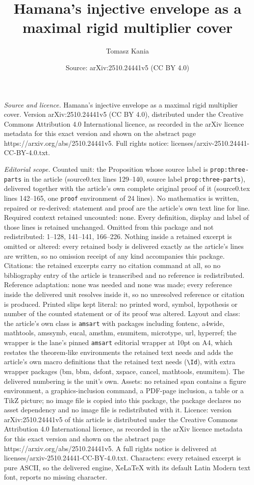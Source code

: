 \documentclass[10pt,a4paper]{amsart}
\title[Hamana's injective envelope as a maximal rigid multiplier co]{Hamana's injective envelope as a maximal rigid multiplier cover}
\author{Tomasz Kania}
\date{Source: arXiv:2510.24441v5 (CC BY 4.0)}
\begin{document}
\maketitle

\noindent\emph{Source and licence.} Hamana's injective envelope as a maximal rigid multiplier cover. Version arXiv:2510.24441v5 (CC BY 4.0), distributed under the Creative Commons Attribution 4.0 International licence, as recorded in the arXiv licence metadata for this exact version and shown on the abstract page https://arxiv.org/abs/2510.24441v5. Full rights notice: licenses/arxiv-2510.24441-CC-BY-4.0.txt.\par\smallskip

\noindent\textit{Editorial scope.} Counted unit: the Proposition whose source label is \texttt{prop:three-parts} in the article (source0.tex lines 129--140, source label \texttt{prop:three-parts}), delivered together with the article's own complete original proof of it (source0.tex lines 142--165, one \texttt{proof} environment of 24 lines). No mathematics is written, repaired or re-derived: statement and proof are the article's own text line for line. Required context retained uncounted: none. Every definition, display and label of those lines is retained unchanged. Omitted from this package and not redistributed: 1--128, 141--141, 166--226. Nothing inside a retained excerpt is omitted or altered: every retained body is delivered exactly as the article's lines are written, so no omission receipt of any kind accompanies this package. Citations: the retained excerpts carry no citation command at all, so no bibliography entry of the article is transcribed and no reference is redistributed. Reference adaptation: none was needed and none was made; every reference inside the delivered unit resolves inside it, so no unresolved reference or citation is produced. Printed slips kept literal: no printed word, symbol, hypothesis or number of the counted statement or of its proof was altered. Layout and class: the article's own class is \texttt{amsart} with packages including fontenc, a4wide, mathtools, amssymb, eucal, amsthm, enumitem, microtype, url, hyperref; the wrapper is the lane's pinned \texttt{amsart} editorial wrapper at 10pt on A4, which restates the theorem-like environments the retained text needs and adds the article's own macro definitions that the retained text needs (\texttt{\textbackslash Id}), with extra wrapper packages (bm, bbm, dsfont, xspace, cancel, mathtools, enumitem). The delivered numbering is the unit's own. Assets: no retained span contains a figure environment, a graphics-inclusion command, a PDF-page inclusion, a table or a TikZ picture; no image file is copied into this package, the package declares no asset dependency and no image file is redistributed with it. Licence: version arXiv:2510.24441v5 of this article is distributed under the Creative Commons Attribution 4.0 International licence, as recorded in the arXiv licence metadata for this exact version and shown on the abstract page https://arxiv.org/abs/2510.24441v5. A full rights notice is delivered at licenses/arxiv-2510.24441-CC-BY-4.0.txt. Characters: every retained excerpt is pure ASCII, so the delivered engine, XeLaTeX with its default Latin Modern text font, reports no missing character.
\end{document}
